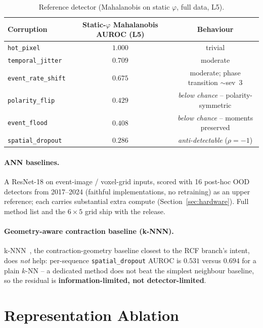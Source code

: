 ﻿\documentclass{article} %
\theoremstyle{remark}
\begin{document}
\begin{table}[t]
  \centering\small
  \caption{Reference detector (Mahalanobis on static $\varphi$, full data, L5).}
  \label{tab:baseline-maha}
  \begin{tabular}{lcc}
    \toprule
    Corruption & Static-$\varphi$ Mahalanobis AUROC (L5) & Behaviour \\
    \midrule
    \texttt{hot\_pixel}        & $1.000$ & trivial \\
    \texttt{temporal\_jitter}  & $0.709$ & moderate \\
    \texttt{event\_rate\_shift}& $0.675$ & moderate; phase transition $\sim$sev~3 \\
    \texttt{polarity\_flip}    & $0.429$ & \emph{below chance} -- polarity-symmetric \\
    \texttt{event\_flood}      & $0.408$ & \emph{below chance} -- moments preserved \\
    \texttt{spatial\_dropout}  & $0.286$ & \emph{anti-detectable} ($\rho=-1$) \\
    \bottomrule
  \end{tabular}
\end{table}

\paragraph{ANN baselines.} A ResNet-18 on event-image / voxel-grid inputs, scored with 16 post-hoc
OOD detectors from 2017--2024 (faithful implementations, no retraining) as an upper reference; each
carries substantial extra compute (Section~\ref{sec:hardware}). Full method list and the $6{\times}5$
grid ship with the release.

\paragraph{Geometry-aware contraction baseline (k-NNN).} k-NNN~\citep{nizan2023knnn}, the
contraction-geometry baseline closest to the RCF branch's intent, does \emph{not} help:
per-sequence \texttt{spatial\_dropout} AUROC is $0.531$ versus $0.694$ for a plain $k$-NN -- a
dedicated method does not beat the simplest neighbour baseline, so the residual is
\textbf{information-limited, not detector-limited}.

\section{Representation Ablation}
\label{app:repr}
\end{document}
